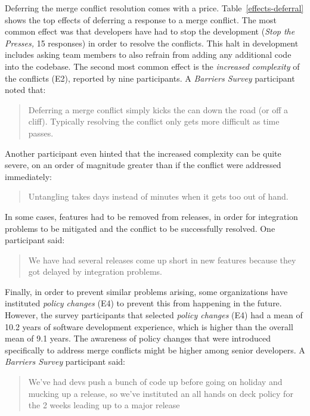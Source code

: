 Deferring the merge conflict resolution comes with a price.
Table~\ref{effects-deferral} shows the top effects of deferring a response to a merge conflict.
The most common effect was that developers have had to stop the development (\emph{Stop the Presses,} 15 responses) in order to resolve the conflicts.
This halt in development includes asking team members to also refrain from adding any additional code into the codebase.
The second most common effect is the \textit{increased complexity} of the conflicts (E2), reported by nine participants.
A \textit{Barriers Survey} participant noted that:
\begin{quotation}
	Deferring a merge conflict simply kicks the can down the road (or off a cliff). Typically resolving the conflict only gets more difficult as time passes.
\end{quotation}
Another participant even hinted that the increased complexity can be quite severe, on an order of magnitude greater than if the conflict were addressed immediately:
\begin{quotation}
	Untangling takes days instead of minutes when it gets too out of hand.
\end{quotation}
In some cases, features had to be removed from releases, in order for integration problems to be mitigated and the conflict to be successfully resolved. One participant said:
\begin{quotation}
	We have had several releases come up short in new features because they got delayed by integration problems.
\end{quotation}
Finally, in order to prevent similar problems arising, some organizations have instituted \textit{policy changes} (E4) to prevent this from happening in the future.
However, the survey participants that selected \textit{policy changes} (E4) had a mean of 10.2 years of software development experience, which is higher than the overall mean of 9.1 years.
The awareness of policy changes that were introduced specifically to address merge conflicts might be higher among senior developers. 
A \textit{Barriers Survey} participant said:
\begin{quotation}
	We've had devs push a bunch of code up before going on holiday and mucking up a release, so we've instituted an all hands on deck policy for the 2 weeks leading up to a major release
\end{quotation}

